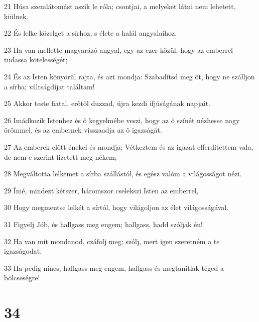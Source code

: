 \par 21 Húsa szemlátomást aszik le róla; csontjai, a melyeket látni nem lehetett, kiülnek.
\par 22 És lelke közelget a sírhoz, s élete a halál angyalaihoz.
\par 23 Ha van mellette magyarázó angyal, egy az ezer közül, hogy az emberrel tudassa kötelességét;
\par 24 És az Isten könyörül rajta, és azt mondja: Szabadítsd meg õt, hogy ne szálljon a sírba; váltságdíjat találtam!
\par 25 Akkor teste fiatal, erõtõl duzzad, újra kezdi ifjúságának napjait.
\par 26 Imádkozik Istenhez és õ kegyelmébe veszi, hogy az õ színét nézhesse nagy örömmel, és az embernek visszaadja az õ igazságát.
\par 27 Az emberek elõtt énekel és mondja: Vétkeztem és az igazat elferdítettem vala, de nem e szerint fizetett meg nékem;
\par 28 Megváltotta lelkemet a sírba szállástól, és egész valóm a világosságot nézi.
\par 29 Ímé, mindezt kétszer, háromszor cselekszi Isten az emberrel,
\par 30 Hogy megmentse lelkét a sírtól, hogy világoljon az élet világosságával.
\par 31 Figyelj Jób, és hallgass meg engem; hallgass, hadd szóljak én!
\par 32 Ha van mit mondanod, czáfolj meg; szólj, mert igen szeretném a te igazságodat.
\par 33 Ha pedig nincs, hallgass meg engem, hallgass és megtanítlak téged a bölcseségre!

\chapter{34}

